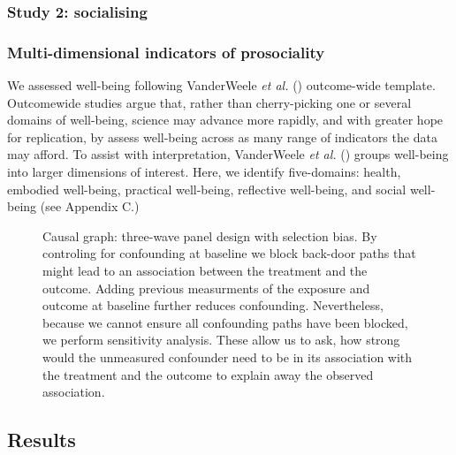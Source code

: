 \documentclass[
  singlecolumn]{article}
\begin{document}
\subsubsection{Study 2: socialising}\label{study-2-socialising}

\subsubsection{Multi-dimensional indicators of
prosociality}\label{multi-dimensional-indicators-of-prosociality}

We assessed well-being following VanderWeele \emph{et al.}
() outcome-wide template.
Outcomewide studies argue that, rather than cherry-picking one or
several domains of well-being, science may advance more rapidly, and
with greater hope for replication, by assess well-being across as many
range of indicators the data may afford. To assist with interpretation,
VanderWeele \emph{et al.} () groups
well-being into larger dimensions of interest. Here, we identify
five-domains: health, embodied well-being, practical well-being,
reflective well-being, and social well-being (see Appendix C.)

\newpage{}

\begin{figure}


\caption{\label{fig-outcomewide-dag}Causal graph: three-wave panel
design with selection bias. By controling for confounding at baseline we
block back-door paths that might lead to an association between the
treatment and the outcome. Adding previous measurments of the exposure
and outcome at baseline further reduces confounding. Nevertheless,
because we cannot ensure all confounding paths have been blocked, we
perform sensitivity analysis. These allow us to ask, how strong would
the unmeasured confounder need to be in its association with the
treatment and the outcome to explain away the observed association.}

\end{figure}%

\newpage{}

\newpage{}

\subsection{Results}\label{results}
\end{document}
